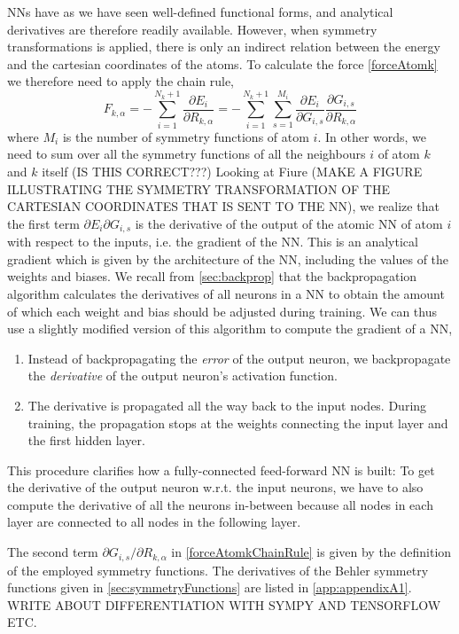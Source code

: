 \documentclass[twoside,english]{uiofysmaster}
\begin{document}
NNs have as we have seen well-defined functional forms, and analytical derivatives are therefore readily available.
However, when symmetry transformations is applied, there is only an indirect relation between the energy and the cartesian coordinates
of the atoms. To calculate the force \eqref{forceAtomk} we therefore need to apply the chain rule,
\begin{equation}
 F_{k,\alpha} = -\sum_{i=1}^{N_k+1}\frac{\partial E_i}{\partial R_{k,\alpha}} = 
 -\sum_{i=1}^{N_k+1}\sum_{s=1}^{M_i}\frac{\partial E_i}{\partial G_{i,s}}\frac{\partial G_{i,s}}{\partial R_{k,\alpha}}
 \label{forceAtomkChainRule}
\end{equation}
where $M_i$ is the number of symmetry functions of atom $i$. In other words, we need to sum over all the symmetry functions
of all the neighbours $i$ of atom $k$ and $k$ itself (IS THIS CORRECT???) Looking at Fiure (MAKE A FIGURE ILLUSTRATING
THE SYMMETRY TRANSFORMATION OF THE CARTESIAN COORDINATES THAT IS SENT TO THE NN), we realize that the first term
$\partial E_i\partial G_{i,s}$ is the derivative of the output of the atomic NN of atom $i$ with respect to the inputs,
i.e. the gradient of the NN. This is an analytical gradient
which is given by the architecture of the NN, including the values of the weights and biases.
We recall from \ref{sec:backprop} that the backpropagation algorithm calculates the derivatives of all neurons in a NN to obtain
the amount of which each weight and bias should be adjusted during training. We can thus use a slightly modified version
of this algorithm to compute the gradient of a NN,
\begin{enumerate}
 \item Instead of backpropagating the \textit{error} of the output neuron, 
 we backpropagate the \textit{derivative} of the output neuron's activation function.
 \item The derivative is propagated all the way back to the input nodes. During training, the propagation
 stops at the weights connecting the input layer and the first hidden layer. 
\end{enumerate}
This procedure clarifies how a fully-connected feed-forward NN is built: To get the derivative of the output neuron
w.r.t. the input neurons, we have to also compute the derivative of all the neurons in-between because
all nodes in each layer are connected to all nodes in the following layer. 

The second term $\partial G_{i,s}/\partial R_{k,\alpha}$ in \eqref{forceAtomkChainRule} is given by the 
definition of the employed symmetry functions. 
The derivatives of the Behler symmetry functions given in \autoref{sec:symmetryFunctions} are listed in \autoref{app:appendixA1}.
WRITE ABOUT DIFFERENTIATION WITH SYMPY AND TENSORFLOW ETC. 
\end{document}
